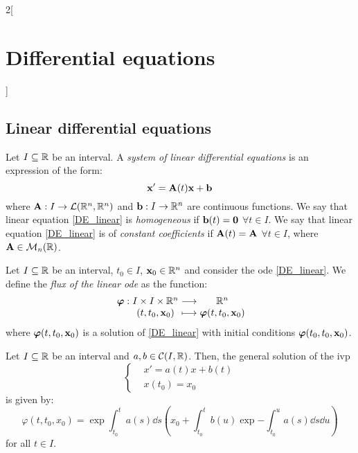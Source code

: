 \documentclass[../../../main.tex]{subfiles}
\begin{document}
\begin{multicols}{2}[\section{Differential equations}]
  \subsection{Linear differential equations}
  \begin{definition}
    Let $I\subseteq\mathbb{R}$ be an interval. A \textit{system of linear differential equations} is an expression of the form:
    \begin{equation}\label{DE_linear}
      \boldsymbol{\mathrm{x}}'=\boldsymbol{\mathrm{A}}(t)\boldsymbol{\mathrm{x}}+\boldsymbol{\mathrm{b}}
    \end{equation}
    where $\boldsymbol{\mathrm{A}}:I\rightarrow\mathcal{L}(\mathbb{R}^n,\mathbb{R}^n)$ and $\boldsymbol{\mathrm{b}}:I\rightarrow\mathbb{R}^n$ are continuous functions.
    We say that linear equation \eqref{DE_linear} is \textit{homogeneous} if $\boldsymbol{\mathrm{b}}(t)=\boldsymbol{\mathrm{0}}$ $\forall t\in I$. We say that linear equation \eqref{DE_linear} is of \textit{constant coefficients} if $\boldsymbol{\mathrm{A}}(t)=\boldsymbol{\mathrm{A}}$ $\forall t\in I$, where $\boldsymbol{\mathrm{A}}\in\mathcal{M}_n(\mathbb{R})$.
  \end{definition}
  \begin{definition}
    Let $I\subseteq\mathbb{R}$ be an interval, $t_0\in I$, $\boldsymbol{\mathrm{x}}_0\in\mathbb{R}^n$ and consider the ode \eqref{DE_linear}. We define the \textit{flux of the linear ode} as the function:
    $$
      \function{\vectorfunction{\varphi}}{I\times I\times \RR^n}{\RR^n}{(t,t_0,\vectorfunction{x}_0)}{\vectorfunction{\varphi}(t,t_0,\vectorfunction{x}_0)}
    $$
    where $\boldsymbol{\mathrm{\varphi}}(t,t_0,\boldsymbol{\mathrm{x}}_0)$ is a solution of \eqref{DE_linear} with initial conditions $\boldsymbol{\mathrm{\varphi}}(t_0,t_0,\boldsymbol{\mathrm{x}}_0)$.
  \end{definition}
  \begin{prop}
    Let $I\subseteq\mathbb{R}$ be an interval and $a,b\in\mathcal{C}(I,\mathbb{R})$. Then, the general solution of the ivp
    $$\left\{
      \begin{aligned}
         & x'      =a(t)x+b(t) \\
         & x(t_0)  =x_0
      \end{aligned}
      \right.$$
    is given by:
    \begin{equation}\label{DE_sol-lin}
      \varphi(t,t_0,x_0)=\exp{\int_{t_0}^ta(s)\dd s}\left(x_0+\int_{t_0}^tb(u)\exp{-\int_{t_0}^ua(s)\dd s}\dd u\right)
    \end{equation}
    for all $t\in I$.
  \end{prop}

\end{multicols}
\end{document}

